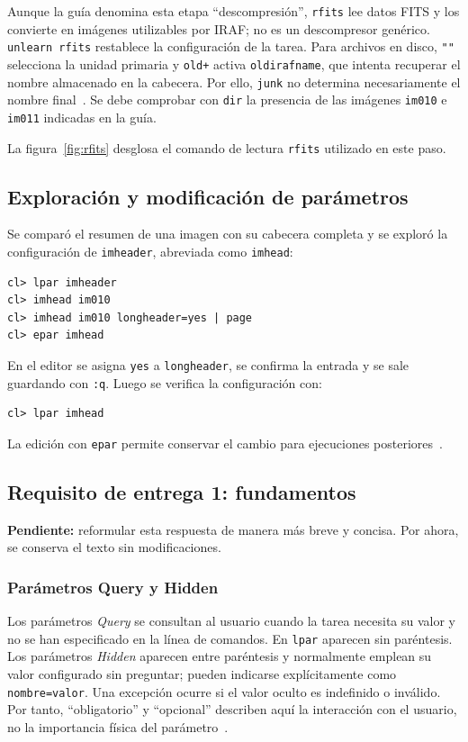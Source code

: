 \documentclass[11pt,a4paper]{article}
\begin{document}
Aunque la guía denomina esta etapa ``descompresión'', \texttt{rfits}
lee datos FITS y los convierte en imágenes utilizables por IRAF; no es
un descompresor genérico. \texttt{unlearn rfits} restablece la configuración
de la tarea. Para archivos en disco, \verb|""| selecciona la unidad
primaria y \texttt{old+} activa \texttt{oldirafname}, que intenta recuperar
el nombre almacenado en la cabecera. Por ello, \texttt{junk} no determina
necesariamente el nombre final~\cite{iraf}. Se debe comprobar con
\texttt{dir} la presencia de las imágenes \texttt{im010} e \texttt{im011}
indicadas en la guía.

La figura~\ref{fig:rfits} desglosa el comando de lectura
\texttt{rfits} utilizado en este paso.



\subsection{Exploración y modificación de parámetros}
Se comparó el resumen de una imagen con su cabecera completa y se exploró
la configuración de \texttt{imheader}, abreviada como \texttt{imhead}:
\begin{verbatim}
cl> lpar imheader
cl> imhead im010
cl> imhead im010 longheader=yes | page
cl> epar imhead
\end{verbatim}
En el editor se asigna \texttt{yes} a \texttt{longheader}, se confirma
la entrada y se sale guardando con \texttt{:q}. Luego se verifica la
configuración con:
\begin{verbatim}
cl> lpar imhead
\end{verbatim}
La edición con \texttt{epar} permite conservar el cambio para ejecuciones
posteriores~\cite{iraf}.

\subsection{Requisito de entrega 1: fundamentos}

\textbf{Pendiente:} reformular esta respuesta de manera más breve y concisa.
Por ahora, se conserva el texto sin modificaciones.

\subsubsection*{Parámetros Query y Hidden}
Los parámetros \emph{Query} se consultan al usuario cuando la tarea
necesita su valor y no se han especificado en la línea de comandos.
En \texttt{lpar} aparecen sin paréntesis. Los parámetros \emph{Hidden}
aparecen entre paréntesis y normalmente emplean su valor configurado sin
preguntar; pueden indicarse explícitamente como \texttt{nombre=valor}.
Una excepción ocurre si el valor oculto es indefinido o inválido.
Por tanto, ``obligatorio'' y ``opcional'' describen aquí la interacción
con el usuario, no la importancia física del parámetro~\cite{iraf}.
\end{document}
